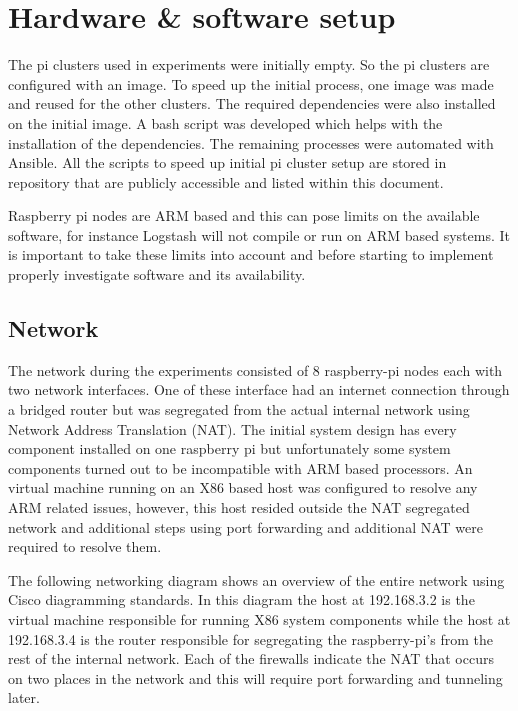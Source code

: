 \documentclass[]{article}
\begin{document}
\section{Hardware \& software setup}
The pi clusters used in experiments were initially empty. So the pi clusters are configured with an image. To speed up the initial process, one image was made and reused for the other clusters. The required dependencies were also installed on the initial image. A bash script was developed which helps with the installation of the dependencies. The remaining processes were automated with Ansible. All the scripts to speed up initial pi cluster setup are stored in repository that are publicly accessible and listed within this document.

Raspberry pi nodes are ARM based and this can pose limits on the available software, for instance Logstash will not compile or run on ARM based systems. It is important to take these limits into account and before starting to implement properly investigate software and its availability.


\subsection{Network}
The network during the experiments consisted of 8 raspberry-pi nodes each with two network interfaces. One of these interface had an internet connection through a bridged router but was segregated from the actual internal network using Network Address Translation (NAT). The initial system design has every component installed on one raspberry pi but unfortunately some system components turned out to be incompatible with ARM based processors. An virtual machine running on an X86 based host was configured to resolve any ARM related issues, however, this host resided outside the NAT segregated network and additional steps using port forwarding and additional NAT were required to resolve them.

The following networking diagram shows an overview of the entire network using Cisco diagramming standards. In this diagram the host at 192.168.3.2 is the virtual machine responsible for running X86 system components while the host at 192.168.3.4 is the router responsible for segregating the raspberry-pi’s from the rest of the internal network. Each of the firewalls indicate the NAT that occurs on two places in the network and this will require port forwarding and tunneling later.
\end{document}

